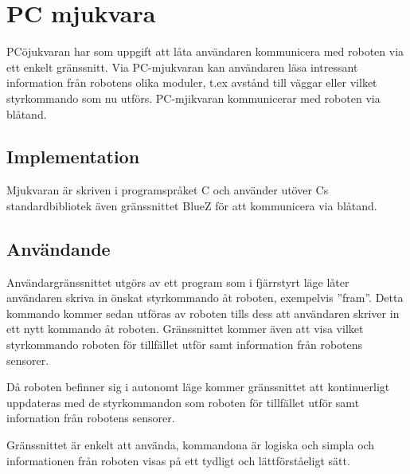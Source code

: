 \section{PC mjukvara}
PCöjukvaran har som uppgift att låta användaren kommunicera med roboten via ett
enkelt gränssnitt. Via PC-mjukvaran kan användaren läsa intressant information
från robotens olika moduler, t.ex avstånd till väggar eller vilket styrkommando
som nu utförs. PC-mjikvaran kommunicerar med roboten via blåtand.

\subsection{Implementation}

Mjukvaran är skriven i programspråket C och använder utöver Cs standardbibliotek
även gränssnittet BlueZ för att kommunicera via blåtand.

\subsection{Användande}

Användargränssnittet utgörs av ett program som i fjärrstyrt läge låter 
användaren skriva in önskat styrkommando åt roboten, exempelvis ''fram''. Detta
kommando kommer sedan utföras av roboten tills dess att användaren skriver in
ett nytt kommando åt roboten. Gränssnittet kommer även att visa vilket
styrkommando roboten för tillfället utför samt information från robotens
sensorer.

Då roboten befinner sig i autonomt läge kommer gränssnittet att kontinuerligt
uppdateras med de styrkommandon som roboten för tillfället utför samt
infornation från robotens sensorer. 

Gränssnittet är enkelt att använda, kommandona är logiska och simpla och
informationen från roboten visas på ett tydligt och lättförståeligt sätt.

% 
% 
% 
% 
% 
% 
% 

